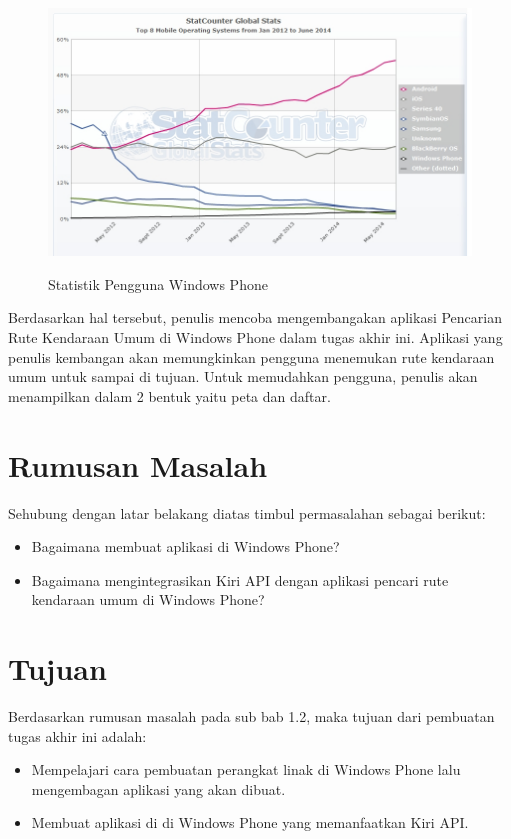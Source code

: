 \clearpage 

\begin{figure}[h]
	\centering
		\includegraphics[scale=0.5]{Gambar/StatCounter} 
	\caption{} {Statistik Pengguna Windows Phone\footnotemark[2]}
	\label{fig:StatCounter}
\end{figure}

\hspace{0.5cm} Berdasarkan hal tersebut, penulis mencoba mengembangakan aplikasi Pencarian Rute Kendaraan Umum di Windows Phone dalam tugas akhir ini. Aplikasi yang penulis kembangan akan memungkinkan pengguna menemukan rute kendaraan umum untuk sampai di tujuan. Untuk memudahkan pengguna, penulis akan menampilkan dalam 2 bentuk yaitu peta dan daftar. 

\section{Rumusan Masalah}
\label{sec:rumusan_masalah}
Sehubung dengan latar belakang diatas timbul permasalahan sebagai berikut:
\begin{itemize}
	\item Bagaimana membuat aplikasi di Windows Phone?
	\item Bagaimana mengintegrasikan Kiri API dengan aplikasi pencari rute kendaraan umum di Windows Phone?
\end{itemize}

\section{Tujuan}
\label{sec:tujuan}
Berdasarkan rumusan masalah pada sub bab 1.2, maka tujuan dari pembuatan tugas akhir ini adalah:
\begin{itemize}
	\item Mempelajari cara pembuatan perangkat linak di Windows Phone lalu mengembagan aplikasi yang akan dibuat.
	\item Membuat aplikasi di di Windows Phone yang memanfaatkan Kiri API.
\end{itemize}

